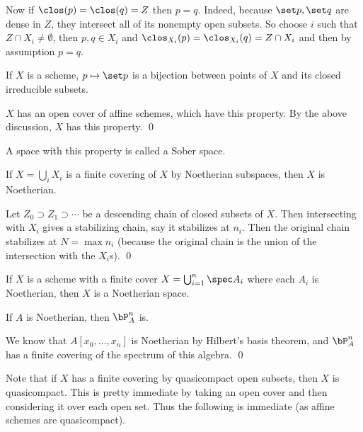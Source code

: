 Now if $\clos(p)=\clos(q)=Z$ then $p=q$.
Indeed, because $\set p,\set q$ are dense in $Z$, they intersect all of its nonempty open subsets.
So choose $i$ such that $Z\cap X_i\neq\emptyset$, then $p,q\in X_i$ and $\clos_{X_i}(p)=\clos_{X_i}(q)=Z\cap X_i$ and then by assumption $p=q$.

\bcoro[name={schemesober}]

    If $X$ is a scheme, $p\mapsto\set p$ is a bijection between points of $X$ and its closed irreducible subsets.

\ecoro

\bproof

    $X$ has an open cover of affine schemes, which have this property.
    By the above discussion, $X$ has this property.
    \qed

\eproof

\bnote

    A space with this property is called a {\emphcolor Sober space}.

\enote

\bprop

    If $X=\bigcup_iX_i$ is a finite covering of $X$ by Noetherian subspaces, then $X$ is Noetherian.

\eprop

\bproof

    Let $Z_0\supset Z_1\supset\cdots$ be a descending chain of closed subsets of $X$.
    Then intersecting with $X_i$ gives a stabilizing chain, say it stabilizes at $n_i$.
    Then the original chain stabilizes at $N=\max n_i$ (because the original chain is the union of the intersection with the $X_i$s).
    \qed

\eproof

\bcoro[name={noetherianschemecover}]

    If $X$ is a scheme with a finite cover $X=\bigcup_{i=1}^n\spec A_i$ where each $A_i$ is Noetherian, then $X$ is a Noetherian space.

\ecoro

\bcoro

    If $A$ is Noetherian, then $\bP^n_A$ is.

\ecoro

\bproof

    We know that $A[x_0,\dots,x_n]$ is Noetherian by Hilbert's basis theorem, and $\bP^n_A$ has a finite covering of the spectrum of this
    algebra.
    \qed

\eproof

Note that if $X$ has a finite covering by quasicompact open subsets, then $X$ is quasicompact.
This is pretty immediate by taking an open cover and then considering it over each open set.
Thus the following is immediate (as affine schemes are quasicompact).

